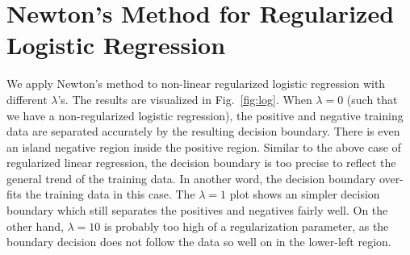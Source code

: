 \documentclass[10pt,a4paper]{article}
\begin{document}
\section{Newton's Method for Regularized Logistic Regression}
%
  We apply Newton's method to non-linear regularized logistic regression with different $\lambda$'s. The results are visualized in Fig.~\ref{fig:log}. When $\lambda=0$ (such that we have a non-regularized logistic regression), the positive and negative training data are separated accurately by the resulting decision boundary. There is even an island negative region inside the positive region. Similar to the above case of regularized linear regression, the decision boundary is too precise to reflect the general trend of the training data. In another word, the decision boundary over-fits the training data in this case. The $\lambda = 1$ plot shows an simpler decision boundary which still separates the positives and negatives fairly well. On the other hand, $\lambda = 10$ is probably too high of a regularization parameter, as the boundary decision does not follow the data so well on in the lower-left region.
\end{document}
